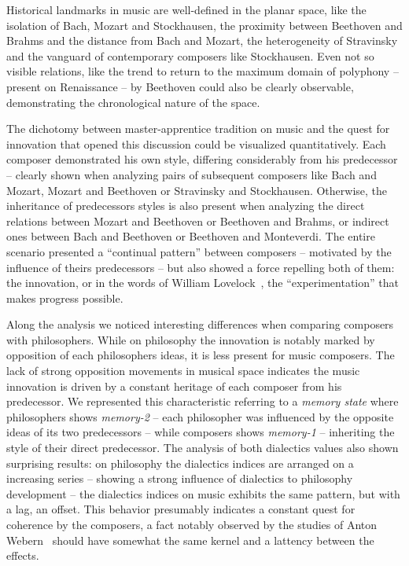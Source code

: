 \documentclass[
 aip,
 jmp,
 amsmath,amssymb,
 reprint,
]{revtex4-1}
\begin{document}
Historical landmarks in music are
well-defined in the planar space, like the isolation of Bach, Mozart
and Stockhausen, the
proximity between Beethoven and Brahms and the distance from Bach and Mozart, the heterogeneity of
Stravinsky and the vanguard of contemporary composers
like Stockhausen. Even not so visible relations, like the trend to return to the
maximum domain of polyphony -- present on Renaissance -- by Beethoven
could also be clearly observable, demonstrating the chronological nature of the
space. 

The dichotomy between
master-apprentice tradition on music and the quest for innovation that
opened this discussion could be visualized quantitatively. Each
composer demonstrated his own style, differing considerably from his
predecessor -- clearly shown when analyzing pairs of subsequent composers like
Bach and Mozart, Mozart and Beethoven or Stravinsky and
Stockhausen. Otherwise, the inheritance of predecessors styles is also
present when analyzing the direct relations between Mozart and
Beethoven or Beethoven and
Brahms, or indirect ones between Bach and Beethoven
or Beethoven and Monteverdi. The entire scenario presented
a ``continual pattern'' between
composers -- motivated by the influence of theirs predecessors -- but also showed a force
repelling both of them: the innovation, or in the words of William
Lovelock~\cite{Lovelock}, the ``experimentation'' that makes progress possible.

Along the analysis we noticed interesting differences when comparing
composers with philosophers. While on philosophy the
innovation is notably marked by opposition of each philosophers ideas,
it is less present for music composers. The lack of strong
opposition movements in musical space indicates the music innovation is driven by
a constant heritage of each composer from his predecessor. We
represented this characteristic referring to a \textit{memory state}
where philosophers shows \textit{memory-2} -- each philosopher was
influenced by the opposite ideas of its two predecessors -- while
composers shows \textit{memory-1} -- inheriting the style of their direct
predecessor. 
The
analysis of both dialectics values also shown surprising
results: on philosophy the dialectics indices are arranged on a
increasing series -- showing a strong influence of
dialectics to philosophy development -- the dialectics indices on
music exhibits the same pattern, but with a lag, an offset. This behavior presumably indicates a
constant quest for coherence by the composers, a fact notably observed by
the studies of Anton Webern~\cite{Webern} should have somewhat the same
kernel and a lattency between the effects.
\end{document}
